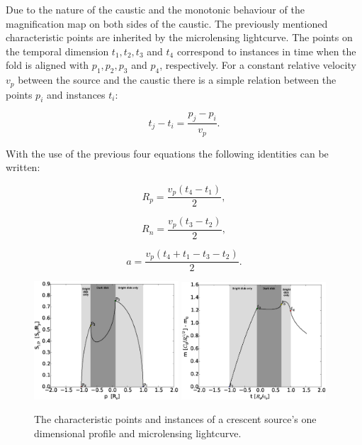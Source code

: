 \documentclass[usenatbib]{mn2e}
\begin{document}
Due to the nature of the caustic and the monotonic behaviour of the magnification map on both sides of the caustic. The previously mentioned characteristic points are inherited by the microlensing lightcurve. The points on the temporal dimension $t_1, t_2, t_3$ and $t_4$ correspond to instances in time when the fold is aligned with $p_1, p_2, p_3$ and $p_4$, respectively. For a constant relative velocity $v_p$ between the source and the caustic there is a simple relation between the points $p_i$ and instances $t_i$:

\begin{equation}
    t_j - t_i = \frac{p_j - p_i}{v_p}.
\end{equation}

With the use of the previous four equations the following identities can be written:

\begin{equation}
    R_p = \frac{v_p \left( t_4 -t_1 \right)}{2}, 
\end{equation}

\begin{equation}
        R_n = \frac{v_p \left( t_3 -t_2 \right)}{2}, 
\end{equation}

\begin{equation}
        a = \frac{v_p \left( t_4 +t_1 - t_3 - t_2 \right)}{2}. 
\end{equation}


\begin{figure}
\centering
	\includegraphics[width = 0.48\textwidth]{figures/ch_points.eps}
        \includegraphics[width = 0.48\textwidth]{figures/ch_instances.eps}
\caption{\label{fig:char_points} The characteristic points and instances of a crescent source's one dimensional profile and microlensing lightcurve. }
\end{figure}
\end{document}
